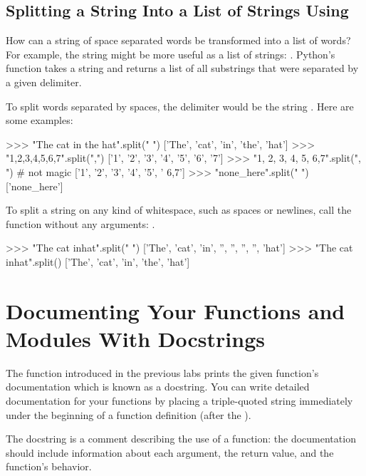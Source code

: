 \documentclass[11pt]{cselabheader}
\begin{document}
\subsection{Splitting a String Into a List of Strings Using }

How can a string of space separated words be transformed into a
list of words? For example, the string 
might be more useful as a list of strings:
.
Python's  function takes a string and returns
a list of all substrings that were separated by a given delimiter.

To split words separated by spaces, the delimiter would be the string .
Here are some examples:

\begin{pyconcode}
>>> "The cat in the hat".split(" ")
['The', 'cat', 'in', 'the', 'hat']
>>> "1,2,3,4,5,6,7".split(",")
['1', '2', '3', '4', '5', '6', '7']
>>> "1, 2, 3, 4, 5,  6,7".split(", ")  # not magic
['1', '2', '3', '4', '5', ' 6,7']
>>> "none_here".split(" ")
['none_here']

\end{pyconcode}

To split a string on any kind of whitespace, such as spaces or newlines, call the
function without any arguments: .
\begin{pyconcode}
>>> "The cat in\nthe     hat".split(" ")
['The', 'cat', 'in\nthe', '', '', '', '', 'hat']
>>> "The cat in\nthe     hat".split()
['The', 'cat', 'in', 'the', 'hat']

\end{pyconcode}

\section{Documenting Your Functions and Modules With Docstrings}

The  function introduced in the previous labs
prints the given function's documentation which is known as a
docstring. You can write detailed documentation for your functions by
placing a triple-quoted string immediately under the beginning of a
function definition (after the ).

The docstring is a comment describing the use of a function: the
documentation should include information about each argument, the
return value, and the function's behavior.
\end{document}
